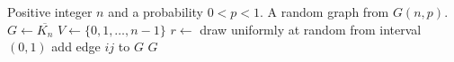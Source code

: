 
\begin{algorithmic}[1]
\Require Positive integer $n$ and a probability $0 < p < 1$.
\Ensure A random graph from $G(n,p)$.
\State $G \gets \overline{K_n}$
\State $V \gets \{0, 1, \dots, n - 1\}$
    \State $r \gets$ draw uniformly at random from interval $(0,1)$
      \State add edge $ij$ to $G$
    \EndIf
  \EndFor
\EndFor
\State \Return $G$
\end{algorithmic}

